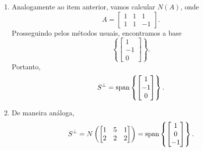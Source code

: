 \documentclass[leqno]{article}
\begin{document}
\begin{enumerate}
\begin{sol}
\begin{enumerate}
		\item Analogamente ao item anterior, vamos calcular \( N ( A ) \), onde
            \begin{equation*}
                A =
                \begin{bmatrix}
                    1 & 1 & 1 \\
                    1 & 1 & -1
                \end{bmatrix}
            .\end{equation*}
            Prosseguindo pelos métodos usuais, encontramos a base
            \begin{equation*}
                \left\{ 
                    \begin{bmatrix}
                        1 \\
                        -1 \\
                        0
                    \end{bmatrix}
                \right\}
            .\end{equation*}
            Portanto,
            \begin{equation*}
                S^{ \perp } = \operatorname{span} 
                \left\{ 
                    \begin{bmatrix}
                        1 \\
                        -1 \\
                        0
                    \end{bmatrix}
                \right\}
            .\end{equation*}
		\item De maneira análoga,
            \begin{equation*}
                S^{ \perp } =
                N \left(
                    \begin{bmatrix}
                        1 & 5 & 1 \\
                        2 & 2 & 2
                    \end{bmatrix}
                \right) =
                \operatorname{span} \left\{ 
                    \begin{bmatrix}
                        1 \\
                        0 \\
                        -1
                    \end{bmatrix}
                \right\}
            .\end{equation*}
	\end{enumerate}    
\end{sol} 



\end{enumerate}
\end{document}
